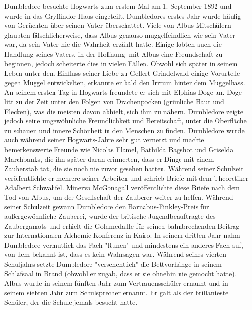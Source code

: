 \documentclass[a4paper, 10pt]{article}
\begin{document}
Dumbledore besuchte Hogwarts zum erstem Mal am 1. September 1892 und wurde in das Gryffindor-Haus eingeteilt. Dumbledores erstes Jahr wurde häufig von Gerüchten über seinen Vater überschattet. Viele von Albus Mitschülern glaubten fälschlicherweise, dass Albus genauso muggelfeindlich wie sein Vater war, da sein Vater nie die Wahrheit erzählt hatte. Einige lobten auch die Handlung seines Vaters, in der Hoffnung, mit Albus eine Freundschaft zu beginnen, jedoch scheiterte dies in vielen Fällen. Obwohl sich später in seinem Leben unter dem Einfluss seiner Liebe zu Gellert Grindelwald einige Vorurteile gegen Muggel entwickelten, erkannte er bald den Irrtum hinter dem Muggelhass.
\vspace{10pt}
\newline
{}  
An seinem ersten Tag in Hogwarts freundete er sich mit Elphias Doge an. Doge litt zu der Zeit unter den Folgen von Drachenpocken (grünliche Haut und Flecken), was die meisten davon abhielt, sich ihm zu nähern. Dumbledore zeigte jedoch seine ungewöhnliche Freundlichkeit und Bereitschaft, unter die Oberfläche zu schauen und innere Schönheit in den Menschen zu finden. Dumbledore wurde auch während seiner Hogwarts-Jahre sehr gut vernetzt und machte bemerkenswerte Freunde wie Nicolas Flamel, Bathilda Bagshot und Griselda Marchbanks, die ihn später daran erinnerten, dass er Dinge mit einem Zauberstab tat, die sie noch nie zuvor gesehen hatten. Während seiner Schulzeit veröffentlichte er mehrere seiner Arbeiten und schrieb Briefe mit dem Theoretiker Adalbert Schwahfel. Minerva McGonagall veröffentlichte diese Briefe nach dem Tod von Albus, um der Gesellschaft der Zauberer weiter zu helfen.
\vspace{10pt}
\newline
{}  
Während seiner Schulzeit gewann Dumbledore den Barnabus-Finkley-Preis für außergewöhnliche Zauberei, wurde der britische Jugendbeauftragte des Zaubergamots und erhielt die Goldmedaille für seinen bahnbrechenden Beitrag zur Internationalen Alchemie-Konferenz in Kairo.
\vspace{10pt}
\newline
{}  
In seinem dritten Jahr nahm Dumbledore vermutlich das Fach "Runen" und mindestens ein anderes Fach auf, von dem bekannt ist, dass es kein Wahrsagen war.
\vspace{10pt}
\newline
{}  
Während seines vierten Schuljahrs setzte Dumbledore "versehentlich" die Bettvorhänge in seinem Schlafsaal in Brand (obwohl er zugab, dass er sie ohnehin nie gemocht hatte).
\vspace{10pt}
\newline
{}  
Albus wurde in seinem fünften Jahr zum Vertrauensschüler ernannt und in seinem siebten Jahr zum Schulsprecher ernannt. Er galt als der brillanteste Schüler, der die Schule jemals besucht hatte.
\end{document}
